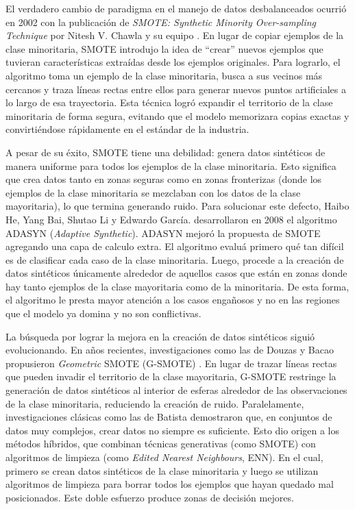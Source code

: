 \documentclass[a4paper,11pt]{book}
\begin{document}
El verdadero cambio de paradigma en el manejo de datos desbalanceados ocurrió en  2002 con la publicación de \textit{SMOTE: Synthetic Minority Over-sampling Technique} por Nitesh V. Chawla y su equipo \cite{chawla2002smote}. 
En lugar de copiar ejemplos de la clase minoritaria, SMOTE introdujo la idea de ``crear'' nuevos ejemplos  que tuvieran características extraídas desde los ejemplos originales. Para lograrlo, el algoritmo toma un ejemplo de la clase minoritaria, busca a sus vecinos más cercanos y traza líneas rectas entre ellos para generar nuevos puntos artificiales a lo largo de esa trayectoria. Esta técnica logró expandir el territorio de la clase minoritaria de forma segura, evitando que el modelo memorizara copias exactas y convirtiéndose rápidamente en el estándar de la industria.~\cite{fernandez2018smote}

A pesar de su  éxito,  SMOTE tiene una debilidad: genera datos sintéticos de manera uniforme para todos los ejemplos de la clase minoritaria. Esto significa que crea datos tanto en zonas seguras como en zonas fronterizas  (donde los ejemplos de la clase minoritaria se mezclaban con los datos de la clase mayoritaria), lo que  termina generando ruido.
Para solucionar este defecto, Haibo He, Yang Bai, Shutao Li y Edwardo García. \cite{he2008adasyn} desarrollaron en 2008 el algoritmo ADASYN (\textit{Adaptive Synthetic}). ADASYN mejoró la propuesta de SMOTE agregando una capa de calculo extra. El algoritmo evaluá primero qué tan difícil es de clasificar cada caso de la clase minoritaria. Luego, procede a la creación de datos sintéticos únicamente alrededor de aquellos casos  que están en zonas donde hay tanto ejemplos de la clase mayoritaria como de la minoritaria. De esta forma, el algoritmo le presta mayor atención a los casos engañosos y no en las regiones que el modelo ya domina y no son conflictivas.


La búsqueda por lograr la mejora en la creación de datos sintéticos siguió evolucionando. En años recientes, investigaciones como las de Douzas y Bacao propusieron \textit{Geometric} SMOTE (G-SMOTE) \cite{douzas2019gsmote}. En lugar de trazar líneas rectas que pueden invadir el territorio de la clase mayoritaria, G-SMOTE restringe la generación de datos sintéticos al interior de  esferas alrededor de las observaciones de la clase minoritaria, reduciendo la creación de ruido.
Paralelamente, investigaciones clásicas como las de Batista  \cite{batista2004study} demostraron que, en conjuntos de datos muy complejos, crear datos no siempre es suficiente. Esto dio origen a los métodos híbridos, que combinan técnicas generativas (como SMOTE) con algoritmos de limpieza (como \textit{Edited Nearest Neighbours}, ENN). En el cual, primero se crean datos sintéticos de la clase minoritaria y luego se utilizan algoritmos de limpieza para borrar todos los ejemplos que hayan quedado mal posicionados. Este doble esfuerzo produce zonas de decisión mejores.
\end{document}
